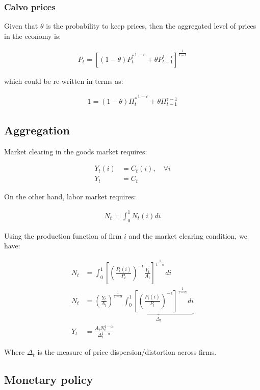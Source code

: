 \documentclass[11pt]{article}
\begin{document}
\subsubsection*{Calvo prices}

Given that $\theta$ is the probability to keep prices, then the aggregated level of prices in the economy is:

\begin{align*}
P_t=[(1-\theta){P_t^*}^{1-\epsilon}+\theta P_{t-1}^{1-\epsilon}]^{\frac{1}{1-\epsilon}}
\end{align*}

which could be re-written in terms as:

\begin{align*}
1=(1-\theta){\Pi_t^*}^{1-\epsilon}+\theta \Pi_{t-1}^{\epsilon-1}
\end{align*}

\subsection*{Aggregation}

Market clearing in the goods market requires:

\begin{align*}
Y_t(i)&=C_t(i), \quad \forall i\\
Y_t&=C_t
\end{align*}

On the other hand, labor market requires:

\begin{align*}
N_t=\int_0^1N_t(i)di
\end{align*}

Using the production function of firm $i$ and the market clearing condition, we have:

\begin{align*}
N_t&=\int_0^1\left[\left(\frac{P_t(i)}{P_t}\right)^{-\epsilon}\frac{Y_t}{A_t}\right]^{\frac{1}{1-\alpha}}di\\
N_t&=\left(\frac{Y_t}{A_t}\right)^{\frac{1}{1-\alpha}}\underbrace{\int_0^1\left[\left(\frac{P_t(i)}{P_t}\right)^{-\epsilon}\right]^{\frac{1}{1-\alpha}}di}_{\Delta_t}\\
Y_t&=\frac{A_tN_t^{1-\alpha}}{\Delta_t^{1-\alpha}}
\end{align*}

Where $\Delta_t$ is the measure of price dispersion/distortion across firms.

\subsection*{Monetary policy}
\end{document}
